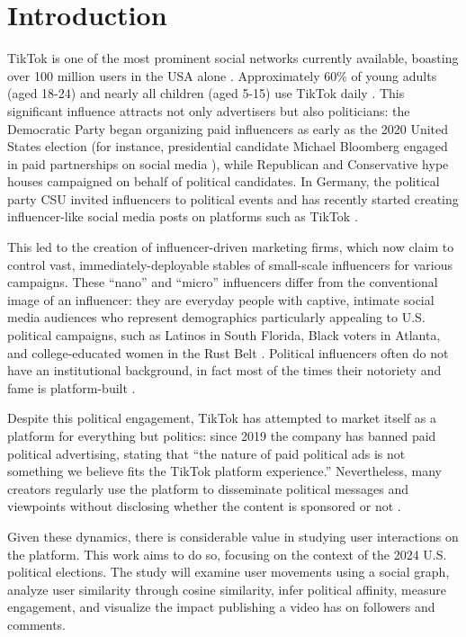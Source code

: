 \section*{Introduction}

TikTok is one of the most prominent social networks currently available, boasting over 100 million users in the USA alone \cite{tktkStat}. Approximately 60\% of young adults (aged 18-24) and nearly all children (aged 5-15) use TikTok daily \cite{https://doi.org/10.1002/poi3.287}. This significant influence attracts not only advertisers but also politicians: the Democratic Party began organizing paid influencers as early as the 2020 United States election (for instance, presidential candidate Michael Bloomberg engaged in paid partnerships on social media \cite{10.3389/fcomm.2021.752656}), while Republican and Conservative hype houses campaigned on behalf of political candidates. In Germany, the political party CSU invited influencers to political events and has recently started creating influencer-like social media posts on platforms such as TikTok \cite{10.3389/fcomm.2021.752656}.

This led to the creation of influencer-driven marketing firms, which now claim to control vast, immediately-deployable stables of small-scale influencers for various campaigns. These “nano” and “micro” influencers differ from the conventional image of an influencer: they are everyday people with captive, intimate social media audiences who represent demographics particularly appealing to U.S. political campaigns, such as Latinos in South Florida, Black voters in Atlanta, and college-educated women in the Rust Belt \cite{theHilltktk}. Political influencers often do not have an institutional background, in fact most of the times their notoriety and fame is platform-built \cite{doi:10.1177/20563051231177938}.

Despite this political engagement, TikTok has attempted to market itself as a platform for everything but politics: since 2019 the company has banned paid political advertising, stating that “the nature of paid political ads is not something we believe fits the TikTok platform experience.” Nevertheless, many creators regularly use the platform to disseminate political messages and viewpoints without disclosing whether the content is sponsored or not \cite{mozilla,politico}.

Given these dynamics, there is considerable value in studying user interactions on the platform. This work aims to do so, focusing on the context of the 2024 U.S. political elections. The study will examine user movements using a social graph, analyze user similarity through cosine similarity, infer political affinity, measure engagement, and visualize the impact publishing a video has on followers and comments.
